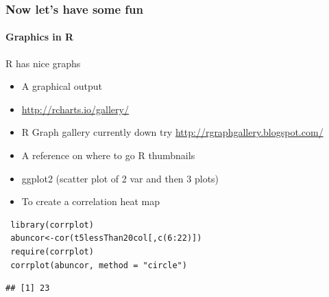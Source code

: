 \documentclass[10pt,handout,english]{beamer}\usepackage[]{graphicx}\usepackage[]{color}
\makeatletter
\newenvironment{kframe}{%
 \def\at@end@of@kframe{}%
 \ifinner\ifhmode%
  \def\at@end@of@kframe{\end{minipage}}%
  \begin{minipage}{\columnwidth}%
 \fi\fi%
 \def\FrameCommand##1{\hskip\@totalleftmargin \hskip-\fboxsep
 \colorbox{shadecolor}{##1}\hskip-\fboxsep
     \hskip-\linewidth \hskip-\@totalleftmargin \hskip\columnwidth}%
 \MakeFramed {\advance\hsize-\width
   \@totalleftmargin\z@ \linewidth\hsize
   \@setminipage}}%
 {\par\unskip\endMakeFramed%
 \at@end@of@kframe}
\newenvironment{knitrout}{}{} %
\makeatother
\begin{document}
\begin{frame}[fragile]
  \frametitle{Now let's have some fun}
  \framesubtitle{Graphics in R}
\begin{block}{R has nice graphs}
\begin{itemize}
\item A graphical output
\item \url{http://rcharts.io/gallery/}
\item R Graph gallery currently down try \url{http://rgraphgallery.blogspot.com/}
\item A reference on where to go R thumbnails 
\item ggplot2 (scatter plot of 2 var and then 3 plots)
\item To create a correlation heat map
\end{itemize}
\end{block}  
\begin{lstlisting}
 library(corrplot)
 abuncor<-cor(t5lessThan20col[,c(6:22)])
 require(corrplot)
 corrplot(abuncor, method = "circle")
\end{lstlisting} 

\begin{knitrout}
\color{fgcolor}\begin{kframe}
\begin{verbatim}
## [1] 23
\end{verbatim}


{\ttfamily\noindent\itshape\color{messagecolor}{\#\# Loading required package: corrplot}}\end{kframe}
\end{knitrout}

\end{frame}
 
\end{document}
